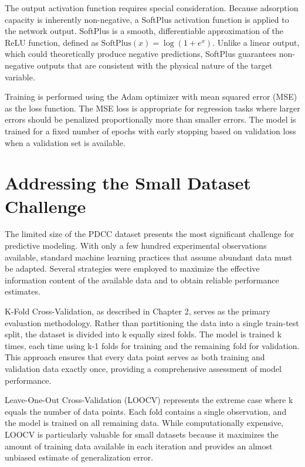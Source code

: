 The output activation function requires special consideration. Because adsorption capacity is inherently non-negative, a SoftPlus activation function is applied to the network output. SoftPlus is a smooth, differentiable approximation of the ReLU function, defined as $\text{SoftPlus}(x) = \log(1 + e^x)$. Unlike a linear output, which could theoretically produce negative predictions, SoftPlus guarantees non-negative outputs that are consistent with the physical nature of the target variable.

Training is performed using the Adam optimizer with mean squared error (MSE) as the loss function. The MSE loss is appropriate for regression tasks where larger errors should be penalized proportionally more than smaller errors. The model is trained for a fixed number of epochs with early stopping based on validation loss when a validation set is available.

\section{Addressing the Small Dataset Challenge}
\label{sec:small_dataset}

The limited size of the PDCC dataset presents the most significant challenge for predictive modeling. With only a few hundred experimental observations available, standard machine learning practices that assume abundant data must be adapted. Several strategies were employed to maximize the effective information content of the available data and to obtain reliable performance estimates.

K-Fold Cross-Validation, as described in Chapter 2, serves as the primary evaluation methodology. Rather than partitioning the data into a single train-test split, the dataset is divided into k equally sized folds. The model is trained k times, each time using k-1 folds for training and the remaining fold for validation. This approach ensures that every data point serves as both training and validation data exactly once, providing a comprehensive assessment of model performance.

Leave-One-Out Cross-Validation (LOOCV) represents the extreme case where k equals the number of data points. Each fold contains a single observation, and the model is trained on all remaining data. While computationally expensive, LOOCV is particularly valuable for small datasets because it maximizes the amount of training data available in each iteration and provides an almost unbiased estimate of generalization error.


